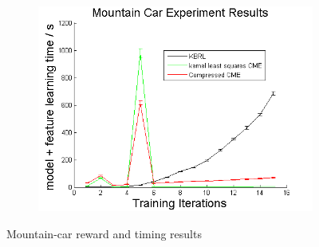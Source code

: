 \documentclass[letterpaper]{article}
\begin{document}
\begin{figure}[htb]
\begin{subfigure}[b]{0.3\textwidth}
\includegraphics[clip, width=\textwidth]{MCmodelfeature.png}
\end{subfigure}
\caption{Mountain-car reward and timing results}
  \label{MCfigs}
\end{figure}
\end{document}
